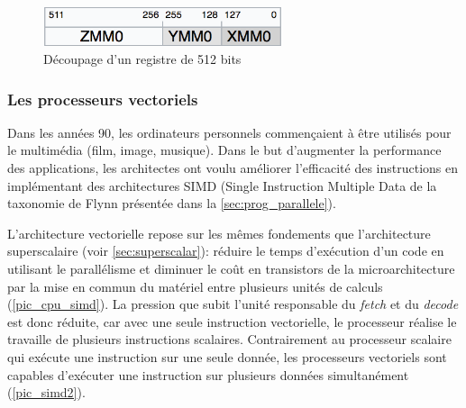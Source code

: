         
            \begin{figure}
                \center
                \includegraphics[width=7cm]{images/Chapitre1/simd_registres.png}
                \caption{\label{pic_simd_registres} Découpage d'un registre de 512 bits}
            \end{figure}

    \subsubsection{Les processeurs vectoriels } \label{sec:cpu_vectoriel}

        Dans les années 90, les ordinateurs personnels commençaient à être utilisés pour le multimédia (film, image, musique). Dans le but d'augmenter la performance des applications, les architectes ont voulu améliorer l'efficacité des instructions en implémentant des architectures SIMD (Single Instruction Multiple Data de la taxonomie de Flynn présentée dans la \autoref{sec:prog_parallele}). 
        
        L'architecture vectorielle repose sur les mêmes fondements que l'architecture superscalaire (voir \autoref{sec:superscalar}): réduire le temps d'exécution d'un code en utilisant le parallélisme et diminuer le coût en transistors de la microarchitecture par la mise en commun du matériel entre plusieurs unités de calculs (\autoref{pic_cpu_simd}). La pression que subit l'unité responsable du \textit{fetch} et du \textit{decode} est donc réduite, car avec une seule instruction vectorielle, le processeur réalise le travaille de plusieurs instructions scalaires.  Contrairement au processeur scalaire qui exécute une instruction sur une seule donnée, les processeurs vectoriels sont capables d'exécuter une instruction sur plusieurs données simultanément (\autoref{pic_simd2}).
        
